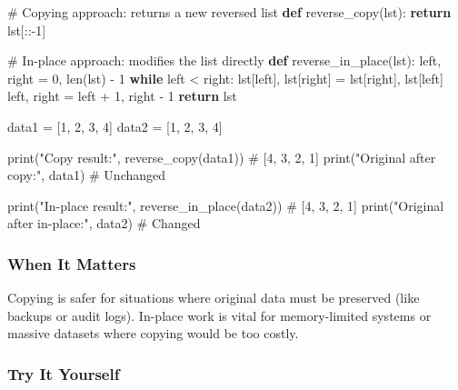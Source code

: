 \documentclass[
  letterpaper,
  DIV=11,
  numbers=noendperiod]{scrreprt}
\newenvironment{Shaded}{\begin{snugshade}}{\end{snugshade}}
\newcommand{\BuiltInTok}[1]{\textcolor[rgb]{0.00,0.23,0.31}{#1}}
\newcommand{\CommentTok}[1]{\textcolor[rgb]{0.37,0.37,0.37}{#1}}
\newcommand{\ControlFlowTok}[1]{\textcolor[rgb]{0.00,0.23,0.31}{\textbf{#1}}}
\newcommand{\DecValTok}[1]{\textcolor[rgb]{0.68,0.00,0.00}{#1}}
\newcommand{\KeywordTok}[1]{\textcolor[rgb]{0.00,0.23,0.31}{\textbf{#1}}}
\newcommand{\NormalTok}[1]{\textcolor[rgb]{0.00,0.23,0.31}{#1}}
\newcommand{\OperatorTok}[1]{\textcolor[rgb]{0.37,0.37,0.37}{#1}}
\newcommand{\StringTok}[1]{\textcolor[rgb]{0.13,0.47,0.30}{#1}}
\begin{document}
\begin{Shaded}
\begin{Highlighting}[]
\CommentTok{\# Copying approach: returns a new reversed list}
\KeywordTok{def}\NormalTok{ reverse\_copy(lst):}
    \ControlFlowTok{return}\NormalTok{ lst[::}\OperatorTok{{-}}\DecValTok{1}\NormalTok{]}

\CommentTok{\# In{-}place approach: modifies the list directly}
\KeywordTok{def}\NormalTok{ reverse\_in\_place(lst):}
\NormalTok{    left, right }\OperatorTok{=} \DecValTok{0}\NormalTok{, }\BuiltInTok{len}\NormalTok{(lst) }\OperatorTok{{-}} \DecValTok{1}
    \ControlFlowTok{while}\NormalTok{ left }\OperatorTok{\textless{}}\NormalTok{ right:}
\NormalTok{        lst[left], lst[right] }\OperatorTok{=}\NormalTok{ lst[right], lst[left]}
\NormalTok{        left, right }\OperatorTok{=}\NormalTok{ left }\OperatorTok{+} \DecValTok{1}\NormalTok{, right }\OperatorTok{{-}} \DecValTok{1}
    \ControlFlowTok{return}\NormalTok{ lst}

\NormalTok{data1 }\OperatorTok{=}\NormalTok{ [}\DecValTok{1}\NormalTok{, }\DecValTok{2}\NormalTok{, }\DecValTok{3}\NormalTok{, }\DecValTok{4}\NormalTok{]}
\NormalTok{data2 }\OperatorTok{=}\NormalTok{ [}\DecValTok{1}\NormalTok{, }\DecValTok{2}\NormalTok{, }\DecValTok{3}\NormalTok{, }\DecValTok{4}\NormalTok{]}

\BuiltInTok{print}\NormalTok{(}\StringTok{"Copy result:"}\NormalTok{, reverse\_copy(data1))   }\CommentTok{\# [4, 3, 2, 1]}
\BuiltInTok{print}\NormalTok{(}\StringTok{"Original after copy:"}\NormalTok{, data1)         }\CommentTok{\# Unchanged}

\BuiltInTok{print}\NormalTok{(}\StringTok{"In{-}place result:"}\NormalTok{, reverse\_in\_place(data2)) }\CommentTok{\# [4, 3, 2, 1]}
\BuiltInTok{print}\NormalTok{(}\StringTok{"Original after in{-}place:"}\NormalTok{, data2)           }\CommentTok{\# Changed}
\end{Highlighting}
\end{Shaded}

\subsubsection{When It Matters}\label{when-it-matters-77}

Copying is safer for situations where original data must be preserved
(like backups or audit logs). In-place work is vital for memory-limited
systems or massive datasets where copying would be too costly.

\subsubsection{Try It Yourself}\label{try-it-yourself-79}
\end{document}
